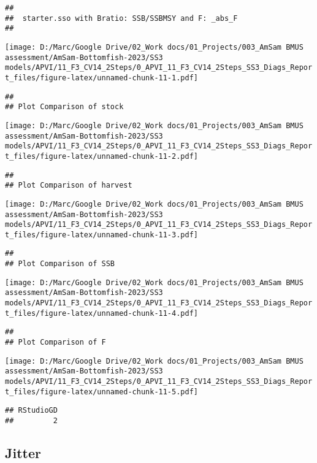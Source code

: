 \documentclass[
]{article}
\begin{document}
\begin{verbatim}
## 
##  starter.sso with Bratio: SSB/SSBMSY and F: _abs_F 
## 
\end{verbatim}

\texttt{[image: D:/Marc/Google Drive/02\_Work docs/01\_Projects/003\_AmSam BMUS assessment/AmSam-Bottomfish-2023/SS3 models/APVI/11\_F3\_CV14\_2Steps/0\_APVI\_11\_F3\_CV14\_2Steps\_SS3\_Diags\_Report\_files/figure-latex/unnamed-chunk-11-1.pdf]}

\begin{verbatim}
## 
## Plot Comparison of stock
\end{verbatim}

\texttt{[image: D:/Marc/Google Drive/02\_Work docs/01\_Projects/003\_AmSam BMUS assessment/AmSam-Bottomfish-2023/SS3 models/APVI/11\_F3\_CV14\_2Steps/0\_APVI\_11\_F3\_CV14\_2Steps\_SS3\_Diags\_Report\_files/figure-latex/unnamed-chunk-11-2.pdf]}

\begin{verbatim}
## 
## Plot Comparison of harvest
\end{verbatim}

\texttt{[image: D:/Marc/Google Drive/02\_Work docs/01\_Projects/003\_AmSam BMUS assessment/AmSam-Bottomfish-2023/SS3 models/APVI/11\_F3\_CV14\_2Steps/0\_APVI\_11\_F3\_CV14\_2Steps\_SS3\_Diags\_Report\_files/figure-latex/unnamed-chunk-11-3.pdf]}

\begin{verbatim}
## 
## Plot Comparison of SSB
\end{verbatim}

\texttt{[image: D:/Marc/Google Drive/02\_Work docs/01\_Projects/003\_AmSam BMUS assessment/AmSam-Bottomfish-2023/SS3 models/APVI/11\_F3\_CV14\_2Steps/0\_APVI\_11\_F3\_CV14\_2Steps\_SS3\_Diags\_Report\_files/figure-latex/unnamed-chunk-11-4.pdf]}

\begin{verbatim}
## 
## Plot Comparison of F
\end{verbatim}

\texttt{[image: D:/Marc/Google Drive/02\_Work docs/01\_Projects/003\_AmSam BMUS assessment/AmSam-Bottomfish-2023/SS3 models/APVI/11\_F3\_CV14\_2Steps/0\_APVI\_11\_F3\_CV14\_2Steps\_SS3\_Diags\_Report\_files/figure-latex/unnamed-chunk-11-5.pdf]}

\begin{verbatim}
## RStudioGD 
##         2
\end{verbatim}

\hypertarget{jitter}{%
\subsection{Jitter}\label{jitter}}
\end{document}
